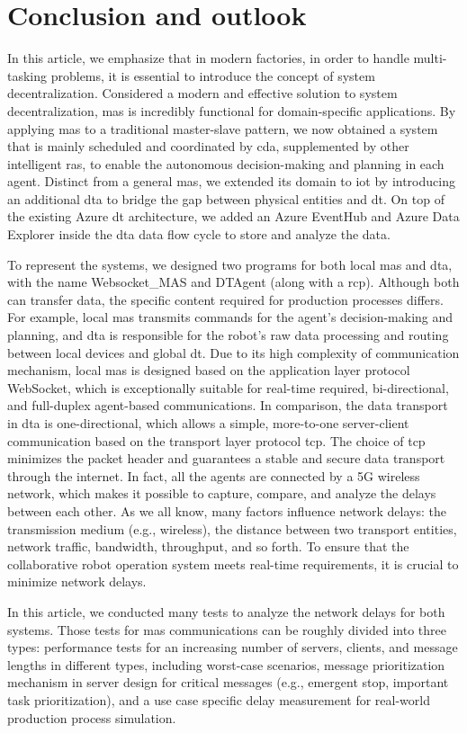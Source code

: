 \chapter{Conclusion and outlook}

In this article, we emphasize that in modern factories, in order to handle 
multi-tasking problems, it is essential to introduce the concept of system 
decentralization. Considered a modern and effective solution to system 
decentralization, \gls{mas} is incredibly functional for domain-specific 
applications. By applying \gls{mas} to a traditional master-slave\cite{egger_deployment-friendly_2020} 
pattern, we now obtained a system that is mainly scheduled and coordinated 
by \gls{cda}, supplemented by other intelligent \gls{ras}, to enable the 
autonomous decision-making and planning in each agent. Distinct from a 
general \gls{mas}, we extended its domain to \gls{iot} by 
introducing an additional \gls{dta} to bridge the gap between physical 
entities and \gls{dt}. On top of the existing Azure \gls{dt} architecture, we 
added an Azure EventHub and Azure Data Explorer inside the \gls{dta} data 
flow cycle to store and analyze the data. 


To represent the systems, we designed two programs for both local 
\gls{mas} and \gls{dta}, with the name Websocket\_MAS and DTAgent 
(along with a \gls{rcp}). Although both can transfer data, the 
specific content required for production processes differs. For 
example, local \gls{mas} transmits commands for the agent's decision-making 
and planning, and \gls{dta} is responsible for the robot's raw data processing 
and routing between local devices and global \gls{dt}. Due to its high complexity 
of communication mechanism, local \gls{mas} is designed based on the application 
layer protocol WebSocket, which is exceptionally suitable for real-time required, 
bi-directional, and full-duplex agent-based communications. 
In comparison, the data transport in \gls{dta} is one-directional, which allows 
a simple, more-to-one server-client communication based on the transport layer 
protocol \gls{tcp}. The choice of \gls{tcp} minimizes the packet header and 
guarantees a stable and secure data transport through the internet. In fact, 
all the agents are connected by a 5G wireless network, which makes it possible 
to capture, compare, and analyze the delays between each other. As we all know, 
many factors influence network delays: the transmission medium (e.g., wireless), 
the distance between two transport entities, network traffic, bandwidth, 
throughput, and so forth. To ensure that the collaborative robot operation 
system meets real-time requirements, it is crucial to minimize network delays. 



In this article, we conducted many tests to analyze the network delays 
for both systems. Those tests for \gls{mas} communications can be roughly 
divided into three types: performance tests for an increasing number of servers, 
clients, and message lengths in different types, including worst-case scenarios, 
message prioritization mechanism in server design for critical messages 
(e.g., emergent stop, important task prioritization), and a use case specific 
delay measurement for real-world production process simulation. 
